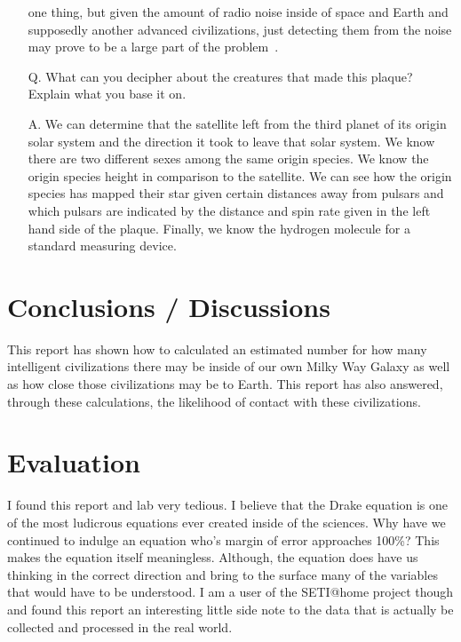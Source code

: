\documentclass{article}
\begin{document}
\begin{enumerate}
one thing, but given the amount of radio noise inside of space and Earth and supposedly another advanced civilizations,
just detecting them from the noise may prove to be a large part of the problem~\cite{noise:372}.
\item[Q.] What can you decipher about the creatures that made this plaque? Explain what you base it on.
\item[A.] We can determine that the satellite left from the third planet of its origin solar system and the direction it took
to leave that solar system. We know there are two different sexes among the same origin species. We know the origin
species height in comparison to the satellite. We can see how the origin species has mapped their star given certain
distances away from pulsars and which pulsars are indicated by the distance and spin rate given in the left hand side
of the plaque. Finally, we know the hydrogen molecule for a standard measuring device.
\end{enumerate}


\section{Conclusions / Discussions}

This report has shown how to calculated an estimated number for how many intelligent civilizations there
may be inside of our own Milky Way Galaxy as well as how close those civilizations may be to Earth. This report
has also answered, through these calculations, the likelihood of contact with these civilizations.


\section{Evaluation}

I found this report and lab very tedious. I believe that the Drake equation is one of the most ludicrous
equations ever created inside of the sciences. Why have we continued to indulge an equation who's margin
of error approaches 100\%? This makes the equation itself meaningless. Although, the equation does
have us thinking in the correct direction and bring to the surface many of the variables that would
have to be understood. I am a user of the SETI@home project though and found this report an
interesting little side note to the data that is actually be collected and processed in the real world.
\end{document}
